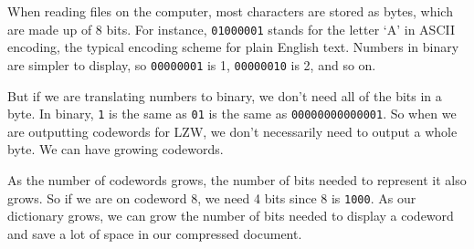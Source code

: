 \documentclass[12pt,twoside]{reedthesis}
\begin{document}
When reading files on the computer, most characters are stored as bytes, which are made up of 8 bits. For instance, \texttt{01000001} stands for the letter `A' in ASCII encoding, the typical encoding scheme for plain English text. Numbers in binary are simpler to display, so \texttt{00000001} is 1, \texttt{00000010} is 2, and so on.

But if we are translating numbers to binary, we don't need all of the bits in a byte. In binary, \texttt{1} is the same as \texttt{01} is the same as \texttt{00000000000001}. So when we are outputting codewords for LZW, we don't necessarily need to output a whole byte. We can have growing codewords.

As the number of codewords grows, the number of bits needed to represent it also grows. So if we are on codeword 8, we need 4 bits since 8 is \texttt{1000}. As our dictionary grows, we can grow the number of bits needed to display a codeword and save a lot of space in our compressed document.
\end{document}
